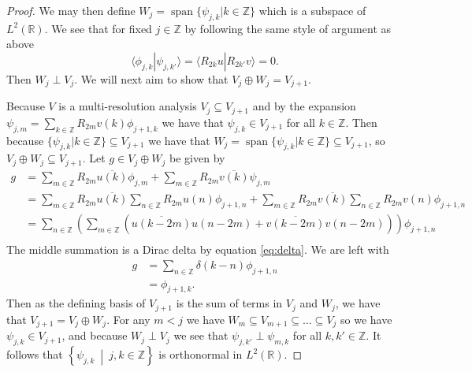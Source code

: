 \documentclass{report}
\newcommand{\Z}{\mathbb{Z}}
\newcommand{\R}{\mathbb{R}}
\DeclareMathOperator{\spa}{span}
\begin{document}
\begin{proof}
We may then define $W_j=\spa \{\psi_{j,k}|k\in \Z\}$ which is a subspace of $L^2 (\R )$. We see that for fixed $j\in \Z$ by following the same style of argument as above
$$
\langle \phi_{j,k} | \psi_{j,k'} \rangle= \langle R_{2k}u| R_{2k'}v \rangle=0.
$$
Then $W_j \perp V_j$. We will next aim to show that $V_j \oplus W_j= V_{j+1}$.

Because $V$ is a multi-resolution analysis $V_j \subseteq V_{j+1}$ and by the expansion $\psi_{j,m}=\sum_{k\in \Z} R_{2m}v(k) \phi_{j+1,k}$ we have that $\psi_{j,k} \in V_{j+1}$ for all $k \in \Z$. Then because $\{\psi_{j,k} | k\in \Z\} \subseteq V_{j+1}$ we have that $W_j = \spa\{\psi_{j,k} | k\in \Z\} \subseteq V_{j+1}$, so $V_j \oplus W_j \subseteq V_{j+1}$. 
Let $ g \in V_j \oplus W_j$ be given by 
\begin{align*}
g&=\sum_{m \in \Z}R_{2m}\overline{u(k)}\phi_{j,m}+\sum_{m \in \Z}R_{2m}\overline{v(k)}\psi_{j,m}\\
&=\sum_{m \in \Z}R_{2m}\overline{u(k)}\sum_{n\in \Z} R_{2m}u(n)\phi_{j+1,n}+\sum_{m \in \Z}R_{2m}\overline{v(k)}\sum_{n\in \Z} R_{2m}v(n)\phi_{j+1,n}\\
&=\sum_{n\in \Z} \left ( \sum_{m \in \Z}(\overline{u(k-2m)}u(n-2m)+\overline{v(k-2m)} v(n-2m) )\right )\phi_{j+1,n}\\
\end{align*}
The middle summation is a Dirac delta by equation \ref{eq:delta}. We are left with
\begin{align*}
g&=\sum_{n\in \Z}\delta(k-n) \phi_{j+1,n}\\
&=\phi_{j+1,k}.
\end{align*}
Then as the defining basis of $V_{j+1}$ is the sum of terms in $V_j$ and $W_j$, we have that $V_{j+1}=V_j \oplus W_j$. For any $m<j$ we have $W_m \subseteq V_{m+1} \subseteq \ldots \subseteq V_j$ so we have $\psi_{j,k} \in V_{j+1}$, and because $W_j \perp V_j$ we see that $\psi_{j,k'} \perp \psi_{m,k}$ for all $k,k' \in \Z$. It follows that $\left \{ \psi_{j,k} \ \middle | \ j,k \in \Z \right \}$ is orthonormal in $L^2 (\R)$. 


\end{proof}
\end{document}
